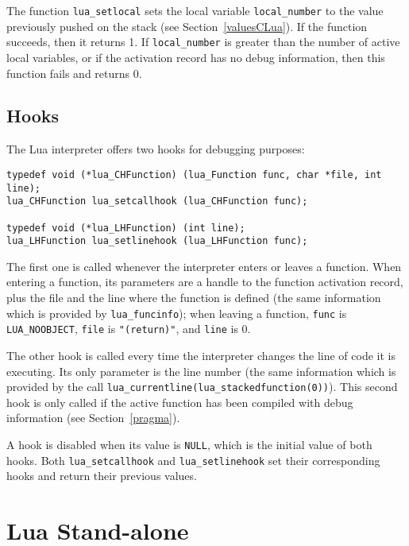 \documentclass[11pt]{article}
\newcommand{\See}[1]{Section~\ref{#1}}
\newcommand{\see}[1]{(see \See{#1})}
\newcommand{\Index}[1]{#1\index{#1}}
\begin{document}
The function \verb|lua_setlocal| sets the local variable
\verb|local_number| to the value previously pushed on the stack
\see{valuesCLua}.
If the function succeeds, then it returns 1.
If \verb|local_number| is greater than the number
of active local variables,
or if the activation record has no debug information,
then this function fails and returns 0.

\subsection{Hooks}

The Lua interpreter offers two hooks for debugging purposes:
\begin{verbatim}
typedef void (*lua_CHFunction) (lua_Function func, char *file, int line);
lua_CHFunction lua_setcallhook (lua_CHFunction func);

typedef void (*lua_LHFunction) (int line);
lua_LHFunction lua_setlinehook (lua_LHFunction func);
\end{verbatim}
The first one is called whenever the interpreter enters or leaves a
function.
When entering a function,
its parameters are a handle to the function activation record,
plus the file and the line where the function is defined
(the same information which is provided by \verb|lua_funcinfo|);
when leaving a function, \verb|func| is \verb|LUA_NOOBJECT|,
\verb|file| is \verb|"(return)"|, and \verb|line| is 0.

The other hook is called every time the interpreter changes
the line of code it is executing.
Its only parameter is the line number
(the same information which is provided by the call
\verb|lua_currentline(lua_stackedfunction(0))|).
This second hook is only called if the active function
has been compiled with debug information \see{pragma}.

A hook is disabled when its value is \verb|NULL|,
which is the initial value of both hooks.
Both \verb|lua_setcallhook| and \verb|lua_setlinehook|
set their corresponding hooks and return their previous values.



\section{\Index{Lua Stand-alone}} \label{lua-sa}
\end{document}
